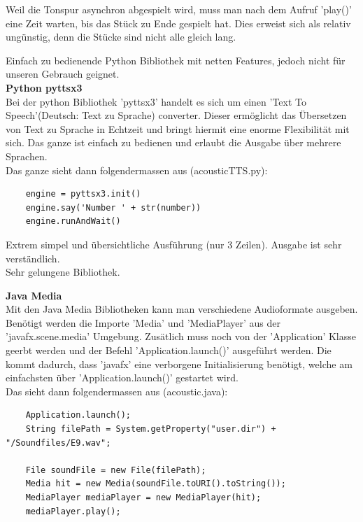 \documentclass[../../../main.tex]{subfiles}
\begin{document}
    Weil die Tonspur asynchron abgespielt wird, muss man nach dem Aufruf 'play()' eine Zeit warten, bis das Stück zu Ende gespielt hat.
    Dies erweist sich als relativ ungünstig, denn die Stücke sind nicht alle gleich lang.

    Einfach zu bedienende Python Bibliothek mit netten Features, jedoch nicht für unseren Gebrauch geignet.\\

    \textbf{Python pyttsx3}\\
    Bei der python Bibliothek 'pyttsx3' handelt es sich um einen 'Text To Speech'(Deutsch: Text zu Sprache) converter.
    Dieser ermöglicht das Übersetzen von Text zu Sprache in Echtzeit und bringt hiermit eine enorme Flexibilität mit sich.
    Das ganze ist einfach zu bedienen und erlaubt die Ausgabe über mehrere Sprachen.\\

    Das ganze sieht dann folgendermassen aus (acousticTTS.py):
    \begin{lstlisting}
    engine = pyttsx3.init()
    engine.say('Number ' + str(number))
    engine.runAndWait()
    \end{lstlisting}

    Extrem simpel und übersichtliche Ausführung (nur 3 Zeilen). Ausgabe ist sehr verständlich.\\
    Sehr gelungene Bibliothek.

    \textbf{Java Media}\\
    Mit den Java Media Bibliotheken kann man verschiedene Audioformate ausgeben.
    Benötigt werden die Importe 'Media' und 'MediaPlayer' aus der 'javafx.scene.media' Umgebung.
    Zusätlich muss noch von der 'Application' Klasse geerbt werden und der Befehl 'Application.launch()' ausgeführt werden.
    Die kommt dadurch, dass 'javafx' eine verborgene Initialisierung benötigt,
    welche am einfachsten über 'Application.launch()' gestartet wird.\\

    Das sieht dann folgendermassen aus (acoustic.java):
    \begin{lstlisting}
    Application.launch();
    String filePath = System.getProperty("user.dir") + "/Soundfiles/E9.wav";

    File soundFile = new File(filePath);
    Media hit = new Media(soundFile.toURI().toString());
    MediaPlayer mediaPlayer = new MediaPlayer(hit);
    mediaPlayer.play();
    \end{lstlisting}
\end{document}
